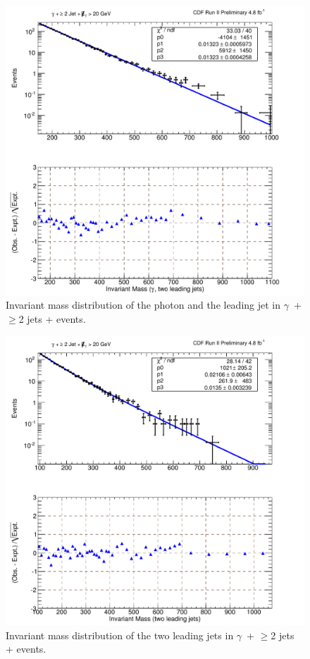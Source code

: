 \begin{figure}[htb!]
\centering
\includegraphics[scale=\resultsMassFitScale,keepaspectratio=true]{gjetsmet_pj2_pj1j2MassFit.pdf}
\caption{Invariant mass distribution of the photon and the leading jet in $\gamma$~+ $\geq$2 jets +  events.}
\label{fig:MassFit_pj2met_pj1j2}
\end{figure}

\begin{figure}[htb!]
\centering
\includegraphics[scale=\resultsMassFitScale,keepaspectratio=true]{gjetsmet_pj2_j1j2MassFit.pdf}
\caption{Invariant mass distribution of the two leading jets in $\gamma$~+ $\geq$2 jets +  events.}
\label{fig:MassFit_pj2met_j1j2}
\end{figure}


